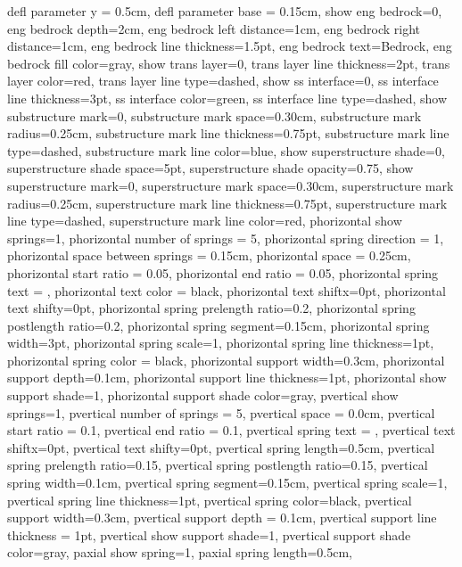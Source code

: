 {{  defl parameter y = 0.5cm,
  defl parameter base = 0.15cm,
  show eng bedrock=0,
  eng bedrock depth=2cm,
  eng bedrock left distance=1cm,
  eng bedrock right distance=1cm,
  eng bedrock line thickness=1.5pt,
  eng bedrock text=Bedrock,
  eng bedrock fill color=gray,
  show trans layer=0,
  trans layer line thickness=2pt,
  trans layer color=red,
  trans layer line type=dashed,
  show ss interface=0,
  ss interface line thickness=3pt,
  ss interface color=green,
  ss interface line type=dashed,
  show substructure mark=0,
  substructure mark space=0.30cm,
  substructure mark radius=0.25cm,
  substructure mark line thickness=0.75pt,
  substructure mark line type=dashed,
  substructure mark line color=blue,
  show superstructure shade=0,
  superstructure shade space=5pt,
  superstructure shade opacity=0.75,
  show superstructure mark=0,
  superstructure mark space=0.30cm,
  superstructure mark radius=0.25cm,
  superstructure mark line thickness=0.75pt,
  superstructure mark line type=dashed,
  superstructure mark line color=red,
  phorizontal show springs=1,
  phorizontal number of springs = 5,
  phorizontal spring direction = 1,
  phorizontal space between springs = 0.15cm,
  phorizontal space = 0.25cm,
  phorizontal start ratio = 0.05,
  phorizontal end ratio = 0.05,
  phorizontal spring text = {},
  phorizontal text color = black,
  phorizontal text shiftx=0pt,
  phorizontal text shifty=0pt,
  phorizontal spring prelength ratio=0.2,
  phorizontal spring postlength ratio=0.2,
  phorizontal spring segment=0.15cm,
  phorizontal spring width=3pt,
  phorizontal spring scale=1,
  phorizontal spring line thickness=1pt,
  phorizontal spring color = black,
  phorizontal support width=0.3cm,
  phorizontal support depth=0.1cm,
  phorizontal support line thickness=1pt,
  phorizontal show support shade=1,
  phorizontal support shade color=gray,
  pvertical show springs=1,
  pvertical number of springs = 5,
  pvertical space = 0.0cm,
  pvertical start ratio = 0.1,
  pvertical end ratio = 0.1,
  pvertical spring text = {},
  pvertical text shiftx=0pt,
  pvertical text shifty=0pt,
  pvertical spring length=0.5cm,
  pvertical spring prelength ratio=0.15,
  pvertical spring postlength ratio=0.15,
  pvertical spring width=0.1cm,
  pvertical spring segment=0.15cm,
  pvertical spring scale=1,
  pvertical spring line thickness=1pt,
  pvertical spring color=black,
  pvertical support width=0.3cm,
  pvertical support depth = 0.1cm,
  pvertical support line thickness = 1pt,
  pvertical show support shade=1,
  pvertical support shade color=gray,
  paxial show spring=1,
  paxial spring length=0.5cm,
}}
